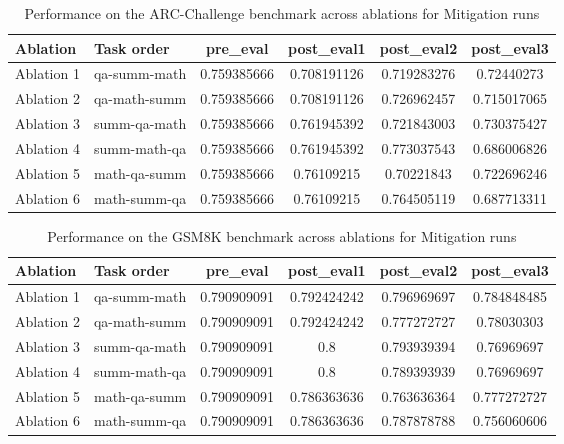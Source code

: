 \begin{table}[!ht]
    \centering
    \caption{Performance on the ARC-Challenge benchmark across ablations for Mitigation runs}
    \begin{tabular}{|l|l|S[table-format=2.4]|S[table-format=2.4]|S[table-format=2.4]|S[table-format=2.4]|}
    \hline
        \textbf{Ablation} & \textbf{Task order} & \textbf{pre\_eval} & \textbf{post\_eval1} & \textbf{post\_eval2} & \textbf{post\_eval3 } \\ \hline
        Ablation 1 & qa-summ-math & 0.759385666 & 0.708191126 & 0.719283276 & 0.72440273  \\ 
        Ablation 2 & qa-math-summ & 0.759385666 & 0.708191126 & 0.726962457 & 0.715017065  \\ 
        Ablation 3 & summ-qa-math & 0.759385666 & 0.761945392 & 0.721843003 & 0.730375427  \\ 
        Ablation 4 & summ-math-qa & 0.759385666 & 0.761945392 & 0.773037543 & 0.686006826  \\ 
        Ablation 5 & math-qa-summ & 0.759385666 & 0.76109215 & 0.70221843 & 0.722696246  \\ 
        Ablation 6 & math-summ-qa & 0.759385666 & 0.76109215 & 0.764505119 & 0.687713311  \\ \hline
    \end{tabular}
    \label{tab:ARCMitigation}
\end{table}

\begin{table}[!ht]
    \centering
    \caption{Performance on the GSM8K benchmark across ablations for Mitigation runs}
    \begin{tabular}{|l|l|S[table-format=2.4]|S[table-format=2.4]|S[table-format=2.4]|S[table-format=2.4]|}
    \hline
        \textbf{Ablation} & \textbf{Task order} & \textbf{pre\_eval} & \textbf{post\_eval1} & \textbf{post\_eval2} & \textbf{post\_eval3 } \\ \hline
        Ablation 1 & qa-summ-math & 0.790909091 & 0.792424242 & 0.796969697 & 0.784848485  \\ 
        Ablation 2 & qa-math-summ & 0.790909091 & 0.792424242 & 0.777272727 & 0.78030303  \\ 
        Ablation 3 & summ-qa-math & 0.790909091 & 0.8 & 0.793939394 & 0.76969697  \\ 
        Ablation 4 & summ-math-qa & 0.790909091 & 0.8 & 0.789393939 & 0.76969697  \\ 
        Ablation 5 & math-qa-summ & 0.790909091 & 0.786363636 & 0.763636364 & 0.777272727  \\ 
        Ablation 6 & math-summ-qa & 0.790909091 & 0.786363636 & 0.787878788 & 0.756060606  \\ \hline
    \end{tabular}
    \label{tab:GSM8KMitigation}
\end{table}

